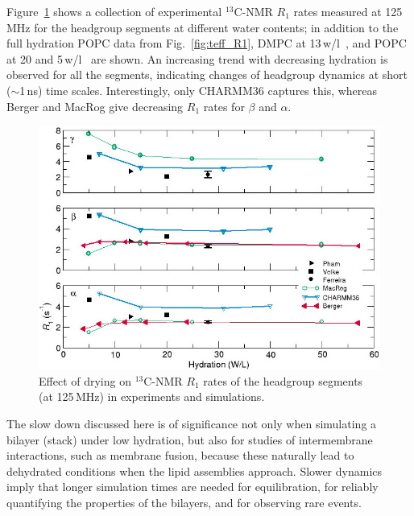 \documentclass[journal=jpcbfk,manuscript=article,layout=twocolumn]{achemso}
\begin{document}
Figure~\ref{fig:dehydrationR1} shows
a collection of experimental $^{13}$C-NMR $R_1$ rates
measured at 125\,MHz for the headgroup segments
at different water contents;
in addition to the full hydration POPC data from Fig.~\ref{fig:teff_R1},
DMPC at 13\,w/l~\cite{pham15}, %
and POPC at 20 and 5\,w/l~\cite{Volke:1995a} %
are shown.
%
An increasing trend with decreasing hydration is observed for all the segments,
indicating changes of headgroup dynamics at short ($\sim$1\,ns) time scales.
Interestingly, only CHARMM36 captures this,
whereas Berger and MacRog give decreasing $R_1$ rates for $\beta$ and $\alpha$.
%
\begin{figure}[ht!]
\centering
\includegraphics[width=\columnwidth]{../Figs/dehydrationR1.jpeg} 
\caption{Effect of drying on $^{13}$C-NMR $R_1$ rates of the headgroup segments (at 125\,MHz)
in experiments and simulations.}
\label{fig:dehydrationR1}
\end{figure}

The slow down discussed here is of significance
not only when simulating a bilayer (stack) under low hydration,
but also for studies of inter\-membrane interactions, such as membrane fusion, because these naturally lead to dehydrated conditions when the lipid assemblies approach. Slower dynamics imply that longer simulation times are needed for equilibration, for reliably quantifying the properties of the bilayers, and for observing rare events. %
\end{document}
